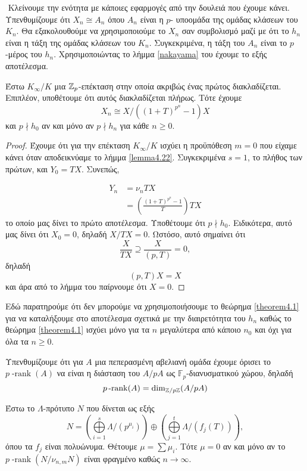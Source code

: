 $ $\newline
Κλείνουμε την ενότητα με κάποιες εφαρμογές από την δουλειά που έχουμε κάνει. Υπενθυμίζουμε ότι $X_n \cong A_n$ όπου $A_n$ είναι η $p$- υποομάδα της ομάδας κλάσεων του $K_n$. Θα εξακολουθούμε να χρησιμοποιούμε το $X_n$ σαν συμβολισμό μαζί με ότι το $h_n$ είναι η τάξη της ομάδας κλάσεων του $K_n$. Συγκεκριμένα, η τάξη του $A_n$ είναι το $p$-μέρος του $h_n$. Χρησιμοποιώντας το λήμμα \ref{nakayama} του  έχουμε το εξής αποτέλεσμα.

\begin{prop}
    Έστω $K_\infty/K$ μια $\mathbb{Z}_p$-επέκταση στην οποία ακριβώς ένας πρώτος διακλαδίζεται. Επιπλέον, υποθέτουμε ότι αυτός διακλαδίζεται πλήρως. Τότε έχουμε
    $$X_n \cong X/((1+T)^{p^n}-1)X$$ και $p\nmid h_0$ αν και μόνο αν $p\nmid h_n$ για κάθε $n\geq 0$.
\end{prop}

\begin{proof}
    Έχουμε ότι για την επέκταση $K_\infty/K$ ισχύει η προϋπόθεση $m=0$ που είχαμε κάνει όταν αποδεικνύαμε το λήμμα \ref{lemma4.22}. Συγκεκριμένα $s=1$, το πλήθος των πρώτων, και $Y_0 = TX$. Συνεπώς,

    \begin{align*}
        Y_n &= \nu_n TX \\
        &= \left(\frac{(1+T)^{p^n}-1}{T}\right)TX
    \end{align*} το οποίο μας δίνει το πρώτο αποτέλεσμα. Υποθέτουμε ότι $p\nmid h_0$. Ειδικότερα, αυτό μας δίνει ότι $X_0 = 0$, δηλαδή $X/TX = 0$. Ωστόσο, αυτό σημαίνει ότι
    $$\frac{X}{TX} \supseteq \frac{X}{(p,T)} = 0,$$ δηλαδή 
    $$(p,T) X = X$$ και άρα από το λήμμα του  παίρνουμε ότι $X=0$.
\end{proof}

\noindent Εδώ παρατηρούμε ότι δεν μπορούμε να χρησιμοποιήσουμε το θεώρημα \ref{theorem4.1} για να καταλήξουμε στο αποτέλεσμα σχετικά με την διαιρετότητα του $h_n$ καθώς το θεώρημα \ref{theorem4.1} ισχύει μόνο για τα $n$ μεγαλύτερα από κάποιο $n_0$ και όχι για όλα τα $n\geq 0$.

\noindent Υπενθυμίζουμε ότι για $A$ μια πεπερασμένη αβελιανή ομάδα έχουμε όρισει το $p\operatorname{-rank}(A)$ να είναι η διάσταση του $A/pA$ ως $\mathbb{F}_p$-διανυσματικού χώρου, δηλαδή
$$p\operatorname{-rank}(A) = \dim_{\mathbb{Z}/p\mathbb{Z}}(A/pA)$$

\begin{lemma}
    Έστω το $\Lambda$-πρότυπο $N$ που δίνεται ως εξής
    $$N = \left(\bigoplus\limits_{i=1}^s \Lambda/(p^{\mu_i})\right) \oplus \left(\bigoplus \limits_{j=1}^t \Lambda/(f_j(T))\right),$$ όπου τα $f_j$ είναι  πολυώνυμα. Θέτουμε $\mu = \sum \mu_i$. Τότε $\mu = 0$ αν και μόνο αν το $p\operatorname{-rank}(N/\nu_{n,m}N)$ είναι φραγμένο καθώς $n\longrightarrow \infty$.
\end{lemma}

